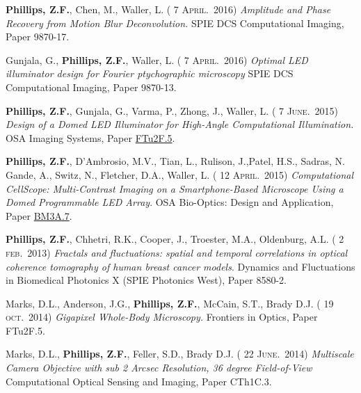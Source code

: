\documentclass[12pt,letterpaper]{article}
\renewcommand{\date}[1]{{} #1}
\begin{document}
\textbf{Phillips, Z.F.}, Chen, M., Waller, L. (\date{7 \textsc{April.}~2016})
\emph{Amplitude and Phase Recovery from Motion Blur Deconvolution.} SPIE DCS Computational Imaging, Paper 9870-17.
\medskip

Gunjala, G., \textbf{Phillips, Z.F.}, Waller, L. (\date{7 \textsc{April.}~2016})
\emph{Optimal LED illuminator design for Fourier ptychographic microscopy} SPIE DCS Computational Imaging, Paper 9870-13.
\medskip

\textbf{Phillips, Z.F.}, Gunjala, G., Varma, P., Zhong, J., Waller, L. (\date{7 \textsc{June.}~2015})
\emph{Design of a Domed LED Illuminator for High-Angle Computational Illumination.} OSA Imaging Systems, Paper \href{https://www.osapublishing.org/abstract.cfm?uri=ISA-2015-ITh1A.2}{FTu2F.5}.
\medskip

\textbf{Phillips, Z.F.}, D'Ambrosio, M.V., Tian, L., Rulison, J.,Patel, H.S., Sadras, N. Gande, A., Switz, N., Fletcher, D.A., Waller, L. (\date{12 \textsc{April.}~2015})
\emph{Computational CellScope: Multi-Contrast Imaging on a Smartphone-Based Microscope Using a Domed Programmable LED Array}. OSA Bio-Optics: Design and Application, Paper \href{https://www.osapublishing.org/abstract.cfm?uri=BODA-2015-BM3A.7}{BM3A.7}.
\medskip

\textbf{Phillips, Z.F.}, Chhetri, R.K., Cooper, J., Troester, M.A., Oldenburg, A.L. (\date{2 \textsc{feb.}~2013})
\emph{Fractals and fluctuations: spatial and temporal correlations in optical coherence tomography of human breast cancer models}. Dynamics and Fluctuations in Biomedical Photonics X (SPIE Photonics West), Paper 8580-2.
\medskip

Marks, D.L., Anderson, J.G., \textbf{Phillips, Z.F.}, McCain, S.T., Brady D.J. (\date{19 \textsc{oct.}~2014})
\emph{Gigapixel Whole-Body Microscopy.} Frontiers in Optics, Paper FTu2F.5.
\medskip

Marks, D.L., \textbf{Phillips, Z.F.}, Feller, S.D., Brady D.J. (\date{22 \textsc{June.}~2014})
\emph{Multiscale Camera Objective with sub 2 Arcsec Resolution, 36 degree Field-of-View} Computational Optical Sensing and Imaging, Paper CTh1C.3.
\medskip
\end{document}
